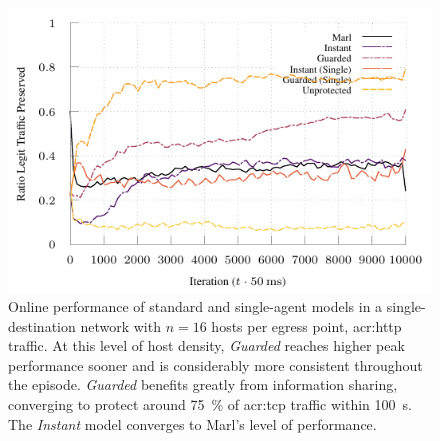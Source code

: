 \begin{figure}
	\centering
	\includegraphics[width=\linewidth]{plots/marl/tnsm-tcp-16-single}
	\caption[Online performance of standard and single-agent models in a single-destination network with $n=16$ hosts per egress point, HTTP traffic.]{
		Online performance of standard and single-agent models in a single-destination network with $n=16$ hosts per egress point, \gls{acr:http} traffic.
		At this level of host density, \emph{Guarded} reaches higher peak performance sooner and is considerably more consistent throughout the episode.
		\emph{Guarded} benefits greatly from information sharing, converging to protect around \qty{75}{\percent} of \gls{acr:tcp} traffic within \qty{100}{\second}.
		The \emph{Instant} model converges to Marl's level of performance.
		\label{fig:tcp-tree-16}
	}
\end{figure}

%	

%	

